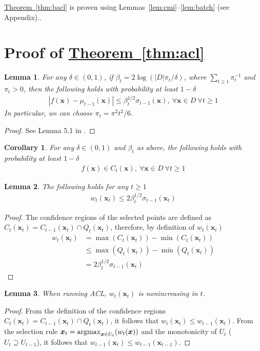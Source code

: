\documentclass{article}
\def\*#1{\bm{#1}}
\newcommand{\theoremref}[1]{\hyperref[#1]{\mbox{Theorem~\ref*{#1}}}}
\newcommand{\argmax}{\operatornamewithlimits{argmax}}
\newtheorem{lemma}{Lemma}
\newtheorem{cor}{Corollary}
\newcommand{\acl}{\textsf{ACL}\xspace}
\begin{document}
\theoremref{thm:bacl} is proven using
Lemmas~\ref{lem:cmi}--\ref{lem:batch}  (see Appendix)..




\appendix
\section{Proof of \theoremref{thm:acl}}

\begin{lemma}
\label{lem:srin1}
For any $\delta \in (0, 1)$, if $\beta_t = 2\log(|D|\pi_t/\delta)$, where
$\sum_{t\geq1}\pi_t^{-1}$ and $\pi_t > 0$, then the following holds with
probability at least $1-\delta$
\begin{align*}
|f(\*x) - \mu_{t-1}(\*x)| \leq \beta_t^{1/2}\sigma_{t-1}(\*x),\ \forall \*x \in D\ \forall t \geq 1
\end{align*}
In particular, we can choose $\pi_t = \pi^2 t^2/6$.
\end{lemma}
\begin{proof}
See Lemma 5.1 in \cite{srinivas2010}.
\end{proof}

\begin{cor}
\label{cor:cs}
For any $\delta \in (0, 1)$ and $\beta_t$ as above, the following holds
with probability at least $1-\delta$
\begin{align*}
f(\*x) \in C_t(\*x),\ \forall \*x \in D\ \forall t \geq 1
\end{align*}
\end{cor}

\begin{lemma}
\label{lem:wb}
The following holds for any $t \geq 1$
\begin{align*}
w_t(\*x_t) \leq 2\beta_t^{1/2}\sigma_{t-1}(\*x_t)
\end{align*}
\end{lemma}
\begin{proof}
The confidence regions of the selected points are defined as
$C_t(\*x_t) = C_{t-1}(\*x_t) \cap Q_t(\*x_t)$, therefore, by
definition of $w_t(\*x_t)$
\begin{align*}
w_t(\*x_t) &= \max(C_t(\*x_t)) - \min(C_t(\*x_t))\\
&\leq \max(Q_t(\*x_t)) - \min(Q_t(\*x_t))\\
&=2\beta_t^{1/2}\sigma_{t-1}(\*x_t)
\end{align*}
\end{proof}

\begin{lemma}
\label{lem:dec}
When running \acl, $w_t(\*x_t)$ is nonincreasing in $t$.
\end{lemma}
\begin{proof}
From the definition of the confidence regions
$C_t(\*x_t) = C_{t-1}(\*x_t) \cap Q_t(\*x_t)$, it follows that
$w_t(\*x_t) \leq w_{t-1}(\*x_t)$. From the selection rule
$\*x_t = \argmax_{\*x\in U_t}(w_t(\*x))$ and the monotonicity of
$U_t$ ($U_t \supseteq U_{t-1}$), it follows that
$w_{t-1}(\*x_t) \leq w_{t-1}(\*x_{t-1})$.
\end{proof}
\end{document}
